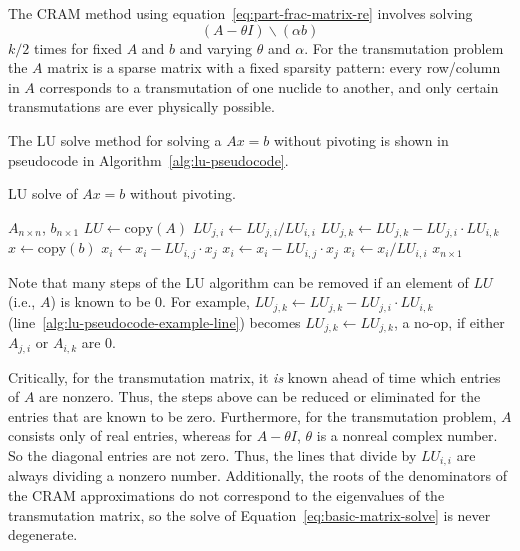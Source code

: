 The CRAM method using equation~\ref{eq:part-frac-matrix-re} involves solving
\begin{equation}
\label{eq:basic-matrix-solve}
 (A - \theta I)\backslash(\alpha b)
\end{equation}
$k/2$ times for fixed $A$ and $b$ and varying $\theta$ and $\alpha$. For the
transmutation problem the $A$ matrix is a sparse matrix with a fixed sparsity
pattern: every row/column in $A$ corresponds to a transmutation of one nuclide
to another, and only certain transmutations are ever physically possible.

The LU solve method for solving a $Ax=b$ without pivoting is shown in
pseudocode in Algorithm~\ref{alg:lu-pseudocode}.
\begin{algorithm}
  \caption{LU solve of $Ax=b$ without pivoting.}\label{alg:lu-pseudocode}
  \begin{algorithmic}[1]
  \REQUIRE $A_{n\times n}$, $b_{n\times 1}$
  \STATE {}
  \STATE {}
  \STATE
  \STATE $LU \leftarrow \mathrm{copy}(A)$
  \STATE
          \STATE $LU_{j, i} \leftarrow LU_{j, i}/LU_{i, i}$
              \STATE $LU_{j, k} \leftarrow LU_{j, k} - LU_{j, i}\cdot LU_{i, k}$\label{alg:lu-pseudocode-example-line}
          \ENDFOR
      \ENDFOR
  \ENDFOR
  \STATE
  \STATE {}
  \STATE $x \leftarrow \mathrm{copy}(b)$
  \STATE
  \STATE {}
          \STATE $x_i \leftarrow x_i - LU_{i, j}\cdot x_j$
      \ENDFOR
  \ENDFOR
  \STATE
  \STATE {}
          \STATE $x_i \leftarrow x_i -LU_{i, j}\cdot x_j$
      \ENDFOR
      \STATE $x_i \leftarrow x_i/LU_{i, i}$
  \ENDFOR
  \STATE
  \ENSURE $x_{n\times 1}$

\end{algorithmic}
\end{algorithm}

Note that many steps of the LU algorithm can be removed if an element of $LU$
(i.e., $A$) is known to be 0. For example,
$LU_{j, k} \leftarrow LU_{j, k} - LU_{j, i}\cdot LU_{i, k}$
(line~\ref{alg:lu-pseudocode-example-line}) becomes
$LU_{j, k} \leftarrow LU_{j, k}$, a no-op, if either $A_{j, i}$ or $A_{i, k}$
are 0.

Critically, for the transmutation matrix, it \textit{is} known ahead of time
which entries of $A$ are nonzero. Thus, the steps above can be reduced or
eliminated for the entries that are known to be zero. Furthermore, for the
transmutation problem, $A$ consists only of real entries, whereas for
$A - \theta I$, $\theta$ is a nonreal complex number. So the diagonal entries
are not zero. Thus, the lines that divide by $LU_{i,i}$ are always dividing a
nonzero number.  Additionally, the roots of the denominators of the CRAM
approximations do not correspond to the eigenvalues of the transmutation
matrix, so the solve of Equation~\ref{eq:basic-matrix-solve} is never
degenerate.

